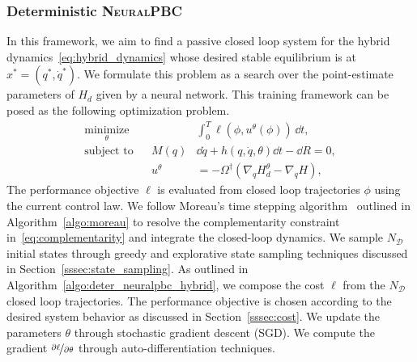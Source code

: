 \subsubsection{Deterministic \textsc{NeuralPBC}}
\label{sssec:data_driven_neuralpbc}

In this framework, we aim to find a passive closed loop system for the hybrid
dynamics~\eqref{eq:hybrid_dynamics} whose desired stable equilibrium is at
$x^* = (q^*, \dot{q}^*)$.
%
We formulate this problem as a search over the point-estimate parameters of
$H_d$ given by a neural network.
%
This training framework can be posed as the following optimization problem. 
\begin{equation}
    \begin{aligned}
        \underset{\theta}{\textrm{minimize}} 
        & & &\int_{0}^{T} \ell \left(\phi,u^{\theta}(\phi) \right) \, \dd t , \\%
        \textrm{subject to}
        & & M(q) &\dd \dot{q} + h(q, \dot{q}, \theta)\dd t - \dd R  = 0,\\%
        & & u^{\theta} &= -\Omega^{\dagger} (\nabla_q H_d^{\theta} - \nabla_q H),%
    \end{aligned}
    \label{eq:hybrid_neuralpbc}
\end{equation}
%
The performance objective $\ell$ is evaluated from closed loop trajectories $\phi$ using the current control law.
%
We follow Moreau's time stepping algorithm~\cite{glocker2005formulation} outlined
in Algorithm~\eqref{algo:moreau} to resolve the complementarity constraint
in~\eqref{eq:complementarity} and integrate the closed-loop dynamics.
%
We sample $N_{\mathcal{D}}$ initial states through greedy and explorative state sampling techniques discussed in Section~\ref{sssec:state_sampling}.
As outlined in Algorithm~\ref{algo:deter_neuralpbc_hybrid}, we compose the cost
$\ell$ from the $N_{\mathcal{D}}$ closed loop trajectories.
The performance objective is chosen according to the desired system behavior as discussed in Section~\ref{sssec:cost}.
We update the parameters $\theta$ through stochastic gradient descent (SGD). 
%
We compute the gradient $\nicefrac{\partial \ell}{\partial \theta}$ through
auto-differentiation techniques.
%

